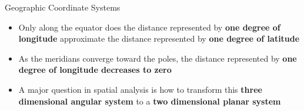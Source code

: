 \documentclass[hyperref={pdfpagelabels=false}]{beamer}
\begin{document}
\begin{frame}{Geographic Coordinate Systems}
	\begin{itemize}
		\item Only along the equator does the distance represented by \textbf{one degree of longitude} approximate the distance represented by \textbf{one degree of latitude}
		\vspace{0.2cm}
		\item As the meridians converge toward the poles, the distance represented by \textbf{one degree of longitude decreases to zero}
		\vspace{0.2cm}	
		\item A major question in spatial analysis is how to transform this \textbf{three dimensional angular system} to a \textbf{two dimensional planar system}
		
	\end{itemize}
\end{frame}
 
 
 
 
 
\end{document}
